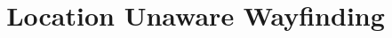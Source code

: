 \documentclass[letter]{sig-alternate}
\begin{document}




\title{Location Unaware Wayfinding}
%
%
%
%
%
\end{document}
